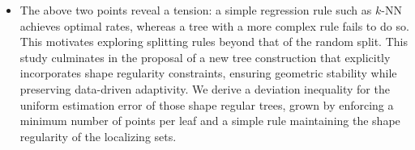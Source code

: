 \documentclass[paper=a4, fontsize=11pt]{scrartcl}
\begin{document}
\begin{itemize}
\newpage

\item[(iii)] The above two points reveal a tension: a simple regression rule such as $k$-NN achieves optimal rates, whereas a tree with a more complex rule fails to do so. This motivates exploring splitting rules beyond that of the random split. This study culminates in the proposal of a new tree construction that explicitly incorporates shape regularity constraints, ensuring geometric stability while preserving data-driven adaptivity. We derive a deviation inequality for the uniform estimation error of those shape regular trees, grown by enforcing a minimum number of points per leaf and a simple rule maintaining the shape regularity of the localizing sets. %
\color{black}
\end{itemize}



\end{document}
